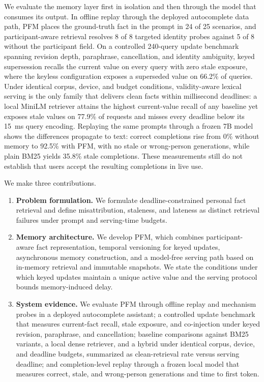 \documentclass[letterpaper]{article} %
\begin{document}
We evaluate the memory layer first in isolation and then through the model that consumes its output. In offline replay through the deployed autocomplete data path, PFM places the ground-truth fact in the prompt in 24 of 25 scenarios, and participant-aware retrieval resolves 8 of 8 targeted identity probes against 5 of 8 without the participant field. On a controlled 240-query update benchmark spanning revision depth, paraphrase, cancellation, and identity ambiguity, keyed supersession recalls the current value on every query with zero stale exposure, where the keyless configuration exposes a superseded value on 66.2\% of queries. Under identical corpus, device, and budget conditions, validity-aware lexical serving is the only family that delivers clean facts within millisecond deadlines: a local MiniLM retriever attains the highest current-value recall of any baseline yet exposes stale values on 77.9\% of requests and misses every deadline below its 15~ms query encoding. Replaying the same prompts through a frozen 7B model shows the differences propagate to text: correct completions rise from 0\% without memory to 92.5\% with PFM, with no stale or wrong-person generations, while plain BM25 yields 35.8\% stale completions. These measurements still do not establish that users accept the resulting completions in live use.

We make three contributions.
\begin{enumerate}
\item \textbf{Problem formulation.} We formulate deadline-constrained personal fact retrieval and define misattribution, staleness, and lateness as distinct retrieval failures under prompt and serving-time budgets.
\item \textbf{Memory architecture.} We develop PFM, which combines participant-aware fact representation, temporal versioning for keyed updates, asynchronous memory construction, and a model-free serving path based on in-memory retrieval and immutable snapshots. We state the conditions under which keyed updates maintain a unique active value and the serving protocol bounds memory-induced delay.
\item \textbf{System evidence.} We evaluate PFM through offline replay and mechanism probes in a deployed autocomplete assistant; a controlled update benchmark that measures current-fact recall, stale exposure, and co-injection under keyed revision, paraphrase, and cancellation; baseline comparisons against BM25 variants, a local dense retriever, and a hybrid under identical corpus, device, and deadline budgets, summarized as clean-retrieval rate versus serving deadline; and completion-level replay through a frozen local model that measures correct, stale, and wrong-person generations and time to first token.
\end{enumerate}
\end{document}
